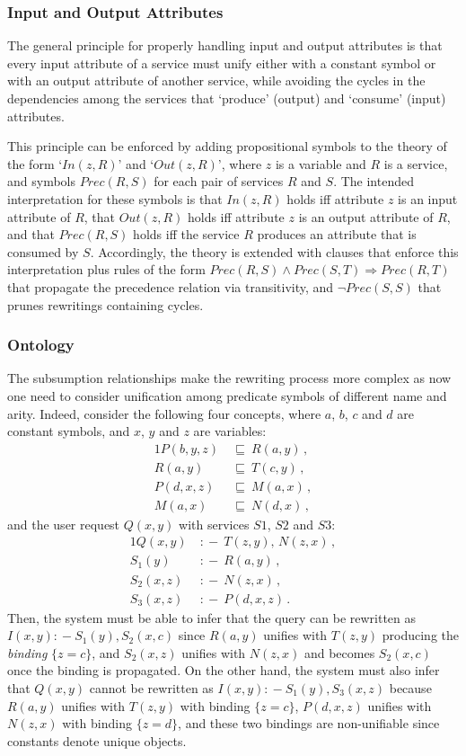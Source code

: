 \documentclass{llncs}
\newcommand{\qrule}{:\!\!-}
\newcommand{\orule}{\sqsubseteq}
\begin{document}
\subsubsection{Input and Output Attributes}

The general principle for properly handling input and output attributes 
is that every input attribute of a service must unify either with a
constant symbol or with an output attribute of another service,
while avoiding the cycles in the dependencies among the services that
`produce' (output) and `consume' (input) attributes.

This principle can be enforced by adding propositional symbols to
the theory of the form `$In(z,R)$' and `$Out(z,R)$', where $z$ is
a variable and $R$ is a service, and symbols $Prec(R,S)$ for each pair
of services $R$ and $S$.
The intended interpretation for these symbols is that $In(z,R)$
holds iff attribute $z$ is an input attribute of $R$, that
$Out(z,R)$ holds iff attribute $z$ is an output attribute of $R$, 
and that $Prec(R,S)$ holds iff the service $R$ produces an attribute
that is consumed by $S$. Accordingly, the theory is extended with
clauses that enforce this interpretation plus rules of the form
$Prec(R,S) \land Prec(S,T)\Rightarrow Prec(R,T)$ that propagate
the precedence relation via transitivity, and $\neg Prec(S,S)$
that prunes rewritings containing cycles.

\subsubsection{Ontology}

The subsumption relationships make the rewriting process more complex
as now one need to consider unification among predicate symbols of different
name and arity. Indeed, consider the following four concepts, where $a$,
$b$, $c$ and $d$ are constant symbols, and $x$, $y$ and $z$ are variables:
\begin{alignat*}{1}
P(b,y,z)\ &\orule\ R(a,y)\,, \\
R(a,y)\   &\orule\ T(c,y)\,, \\
P(d,x,z)\ &\orule\ M(a,x)\,, \\
M(a,x)\   &\orule\ N(d,x)\,,
\end{alignat*}
and the user request $Q(x,y)$ with services $S1$, $S2$ and $S3$:
\begin{alignat*}{1}
Q(x,y)\   &\qrule\ T(z,y),\,N(z,x)\,, \\
S_1(y)\   &\qrule\ R(a,y)\,, \\
S_2(x,z)\ &\qrule\ N(z,x)\,, \\
S_3(x,z)\ &\qrule\ P(d,x,z)\,.
\end{alignat*}
Then, the system must be able to infer that the query can be 
rewritten as $I(x,y) \qrule S_1(y),S_2(x,c)$ since $R(a,y)$
unifies with $T(z,y)$ producing the \emph{binding} $\{z=c\}$,
and $S_2(x,z)$ unifies with $N(z,x)$ and becomes $S_2(x,c)$
once the binding is propagated.
On the other hand, the system must also infer that $Q(x,y)$
cannot be rewritten as $I(x,y)\qrule S_1(y),S_3(x,z)$ because
$R(a,y)$ unifies with $T(z,y)$ with binding $\{z=c\}$,
$P(d,x,z)$ unifies with $N(z,x)$ with binding $\{z=d\}$,
and these two bindings are non-unifiable since constants
denote unique objects.
\end{document}
